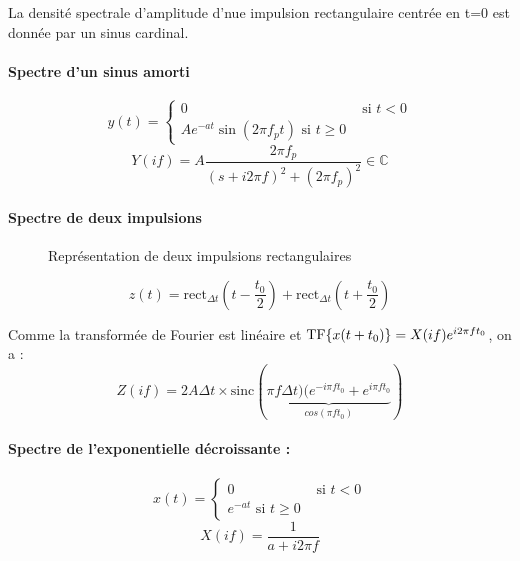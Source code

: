 \documentclass[a4paper,12pt]{report}
\begin{document}
La densité spectrale d'amplitude d'nue impulsion rectangulaire centrée en t=0 est donnée par un sinus cardinal.

\paragraph{Spectre d'un sinus amorti}

\[ y(t) = \begin{cases}
    0 & \text{ si } t < 0 \\
    Ae^{-at} \sin(2\pi f_pt) \text{ si } t \geq 0
\end{cases} \]
\[ Y(if) = A\dfrac{2\pi f_p}{(s + i2\pi f)^2 + (2\pi f_p)^2} \in \mathbb{C} \]

\paragraph{Spectre de deux impulsions}

\begin{figure}[!htbp]
	\centering
	\caption{Représentation de deux impulsions rectangulaires}
\end{figure}

\[ z(t) = \mathrm{rect}_{\Delta t}(t - \dfrac{t_0}{2}) + \mathrm{rect}_{\Delta t}(t + \dfrac{t_0}{2}) \]

Comme la transformée de Fourier est linéaire et $\mathrm{TF} \{  x(t + t_0) \} = X(if)e^{i2\pi ft_0}$, on a :
\[ Z(if) = 2A\Delta t \times \mathrm{sinc}(\underbrace{\pi f\Delta t)(e^{-i\pi ft_0} + e^{i\pi ft_0}}_{cos(\pi ft_0)}) \]

\paragraph{Spectre de l'exponentielle décroissante :}
\[ x(t) = \begin{cases}
    0 & \text{ si } t < 0 \\
    e^{-at} \text{ si } t \geq 0
\end{cases} \]
\[ X(if) = \dfrac{1}{a+i2\pi f} \]
\end{document}
